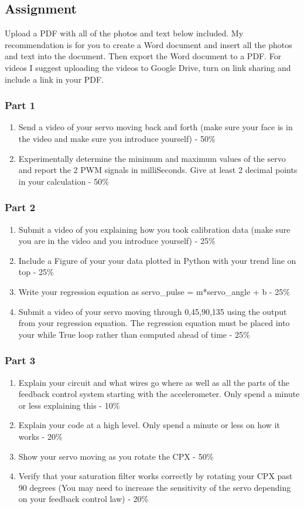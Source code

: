 \subsection{Assignment}

Upload a PDF with all of the photos and text below included. My recommendation is for you to create a Word document and insert all the photos and text into the document. Then export the Word document to a PDF. For videos I suggest uploading the videos to Google Drive, turn on link sharing and include a link in your PDF.
\subsubsection{Part 1}
\begin{enumerate}[itemsep=-5pt]
\item Send a video of your servo moving back and forth (make sure your face is in the video and make sure you introduce yourself) - 50\%
\item Experimentally determine the minimum and maximum values of the servo and report the 2 PWM signals in milliSeconds. Give at least 2 decimal points in your calculation - 50\%
\end{enumerate}
\subsubsection{Part 2}
\begin{enumerate}[itemsep=-5pt]
\item Submit a video of you explaining how you took calibration data (make sure you are in the video and you introduce yourself) - 25\%
\item Include a Figure of your your data plotted in Python with your trend line on top - 25\%
\item Write your regression equation as servo\_pulse = m*servo\_angle + b - 25\%
\item Submit a video of your servo moving through 0,45,90,135 using the output from your regression equation. The regression equation must be placed into your while True loop rather than computed ahead of time -  25\% 
\end{enumerate}
\subsubsection{Part 3}
\begin{enumerate}[itemsep=-5pt]
\item Explain your circuit and what wires go where as well as all the parts of the feedback control system starting with the accelerometer. Only spend a minute or less explaining this - 10\%
\item Explain your code at a high level. Only spend a minute or less on how it works - 20\%
\item Show your servo moving as you rotate the CPX - 50\%
\item Verify that your saturation filter works correctly by rotating your CPX past 90 degrees (You may need to increase the sensitivity of the servo depending on your feedback control law) - 20\% 
\end{enumerate}
